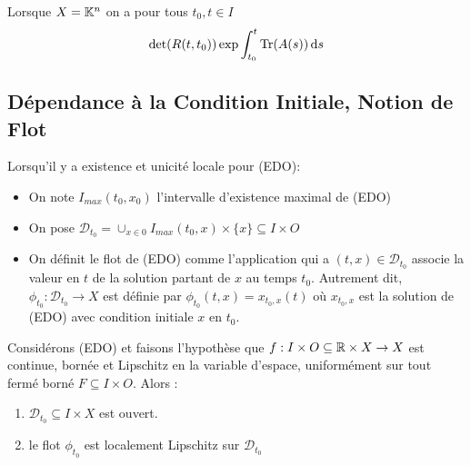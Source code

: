 \documentclass{cours}
\begin{document}
\begin{theorem}
    Lorsque $X = \mathbb{K}^{n}$ on a pour tous $t_{0}, t \in I$ \[\det(R(t, t_{0}))\exp \int_{t_{0}}^{t} \operatorname{Tr}(A(s)){\rm \, d} s\]
\end{theorem}

\subsection{Dépendance à la Condition Initiale, Notion de Flot}
\begin{definition}
    Lorsqu'il y a existence et unicité locale pour (EDO):
    \begin{itemize}
        \item On note $I_{max}(t_{0}, x_{0})$ l'intervalle d'existence maximal de (EDO)
        \item On pose $\mathcal{D}_{t_{0}} = \cup_{x \in 0} I_{max}(t_{0}, x) \times \{x\} \subseteq I \times O$
        \item On définit le flot de (EDO) comme l'application qui a $(t, x) \in \mathcal{D}_{t_{0}}$ associe la valeur en $t$ de la solution partant de $x$ au temps $t_{0}$. Autrement dit, $\phi_{t_{0}} : \mathcal{D}_{t_{0}} \to X$ est définie par $\phi_{t_{0}}(t, x) = x_{t_{0}, x}(t)$ où $x_{t_0, x}$ est la solution de (EDO) avec condition initiale $x$ en $t_{0}$. 
    \end{itemize}
\end{definition}
\begin{theorem}
    Considérons (EDO) et faisons l'hypothèse que $f : I\times O \subseteq \mathbb{R} \times X \to X$ est continue, bornée et Lipschitz en la variable d'espace, uniformément sur tout fermé borné $F \subseteq I \times O$. Alors : 
    \begin{enumerate}
        \item $\mathcal{D}_{t_{0}} \subseteq I \times X$ est ouvert. 
        \item le flot $\phi_{t_{0}}$ est localement Lipschitz sur $\mathcal{D}_{t_{0}}$
    \end{enumerate}
\end{theorem}
\end{document}

